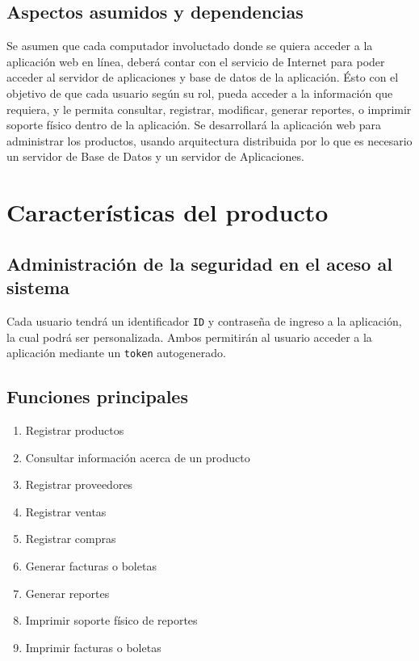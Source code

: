 \documentclass[a4paper,11pt, spanish]{report}
\newcommand{\inlinecode}[1]{%
  \colorbox{light-gray}{\texttt{#1}}
}
\begin{document}
{{{{{      \subsection{Aspectos asumidos y dependencias}
        Se asumen que cada computador involuctado donde se quiera acceder a la aplicación web en línea, deberá contar con el servicio de Internet para poder acceder al servidor de aplicaciones y base de datos de la aplicación. Ésto con el objetivo de que cada usuario según su rol, pueda acceder a la información que requiera, y le permita consultar, registrar, modificar, generar reportes, o imprimir soporte físico dentro de la aplicación.
        Se desarrollará la aplicación web para administrar los productos, usando arquitectura distribuida por lo que es necesario un servidor de Base de Datos y un servidor de Aplicaciones.
        
    \section{Características del producto}
      \subsection{Administración de la seguridad en el aceso al sistema}
        Cada usuario tendrá un identificador \inlinecode{ID}  y contraseña de ingreso a la aplicación, la cual podrá ser personalizada. Ambos permitirán al usuario acceder a la aplicación mediante un \inlinecode{token} autogenerado.
      \subsection{Funciones principales}
      \begin{enumerate}[\indent\textbullet]
        \item Registrar productos
        \item Consultar información acerca de un producto
        \item Registrar proveedores
        \item Registrar ventas
        \item Registrar compras
        \item Generar facturas o boletas
        \item Generar reportes
        \item Imprimir soporte físico de reportes
        \item Imprimir facturas o boletas
      \end{enumerate}
      
}}}}}
\end{document}

